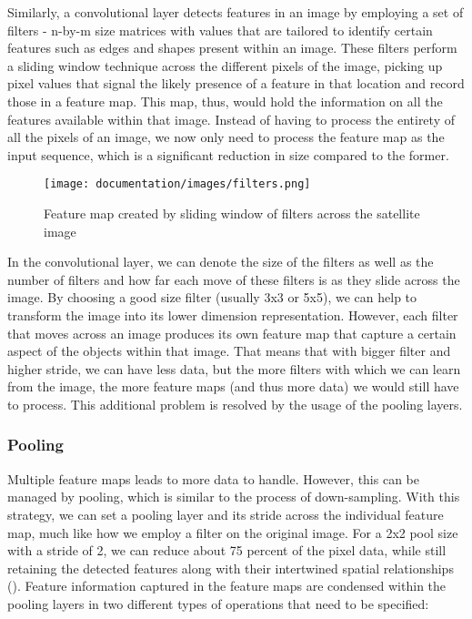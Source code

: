 \documentclass[solid,math,chem,code,plot,gloss]{bmc}
\begin{document}
Similarly, a convolutional layer detects features in an image by employing a set of filters - n-by-m size matrices with values that are tailored to identify certain features such as edges and shapes present within an image. These filters perform a sliding window technique across the different pixels of the image, picking up pixel values that signal the likely presence of a feature in that location and record those in a feature map. This map, thus, would hold the information on all the features available within that image. Instead of having to process the entirety of all the pixels of an image, we now only need to process the feature map as the input sequence, which is a significant reduction in size compared to the former. 

\begin{figure}[hbt!]
    \centering
    \texttt{[image: documentation/images/filters.png]}
    \caption{Feature map created by sliding window of filters across the satellite image}
    \label{fig:filters}
\end{figure}

In the convolutional layer, we can denote the size of the filters as well as the number of filters and how far each move of these filters is as they slide across the image. By choosing a good size filter (usually 3x3 or 5x5), we can help to transform the image into its lower dimension representation. However, each filter that moves across an image produces its own feature map that capture a certain aspect of the objects within that image. That means that with bigger filter and higher stride, we can have less data, but the more filters with which we can learn from the image, the more feature maps (and thus more data) we would still have to process. This additional problem is resolved by the usage of the pooling layers.

\subsubsection{Pooling}

Multiple feature maps leads to more data to handle. However, this can be managed by pooling, which is similar to the process of down-sampling. With this strategy, we can set a pooling layer and its stride across the individual feature map, much like how we employ a filter on the original image. For a 2x2 pool size with a stride of 2, we can reduce about 75 percent of the pixel data, while still retaining the detected features along with their intertwined spatial relationships (\cite{Ferlitsch}). Feature information captured in the feature maps are condensed within the pooling layers in two different types of operations that need to be specified: 
\end{document}
